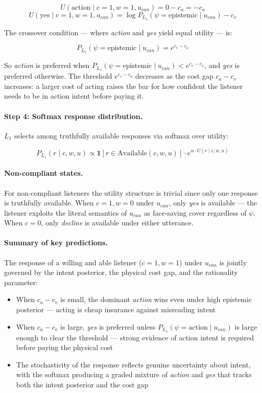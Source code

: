 \documentclass[12pt]{article}
\begin{document}
\[
U(\text{action} \mid c=1, w=1, u_{can}) = 0 - c_a = -c_a
\]
\[
U(\text{yes} \mid c=1, w=1, u_{can})
= \log P_{L_1}(\psi = \text{epistemic} \mid u_{can}) - c_v
\]

The crossover condition --- where \textit{action} and \textit{yes}
yield equal utility --- is:

\[
P_{L_1}(\psi = \text{epistemic} \mid u_{can}) = e^{c_v - c_a}
\]

So \textit{action} is preferred when $P_{L_1}(\psi = \text{epistemic}
\mid u_{can}) < e^{c_v - c_a}$, and \textit{yes} is preferred
otherwise. The threshold $e^{c_v - c_a}$ decreases as the cost gap
$c_a - c_v$ increases: a larger cost of acting raises the bar for how
confident the listener needs to be in action intent before paying it.

\paragraph{Step 4: Softmax response distribution.}

$L_1$ selects among truthfully available responses via softmax over
utility:

\[
P_{L_1}(r \mid c, w, u)
\propto \mathbf{1}[r \in \text{Available}(c, w, u)]
\cdot e^{\alpha \cdot U(r \mid c, w, u)}
\]

\paragraph{Non-compliant states.}

For non-compliant listeners the utility structure is trivial since only
one response is truthfully available. When $c=1, w=0$ under $u_{can}$,
only \textit{yes} is available --- the listener exploits the literal
semantics of $u_{can}$ as face-saving cover regardless of $\psi$.
When $c=0$, only \textit{decline} is available under either utterance.

\paragraph{Summary of key predictions.}

The response of a willing and able listener ($c=1, w=1$) under
$u_{can}$ is jointly governed by the intent posterior, the physical
cost gap, and the rationality parameter:

\begin{itemize}
    \item When $c_a - c_v$ is small, the dominant \textit{action} wins
        even under high epistemic posterior --- acting is cheap
        insurance against misreading intent
    \item When $c_a - c_v$ is large, \textit{yes} is preferred unless
        $P_{L_1}(\psi = \text{action} \mid u_{can})$ is large enough
        to clear the threshold --- strong evidence of action intent is
        required before paying the physical cost
    \item The stochasticity of the response reflects genuine uncertainty
        about intent, with the softmax producing a graded mixture of
        \textit{action} and \textit{yes} that tracks both the intent
        posterior and the cost gap
\end{itemize}
\end{document}
